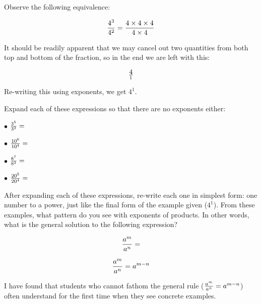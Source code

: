 

Observe the following equivalence:

$${4^3 \over 4^2} = {{4 \times 4 \times 4} \over {4 \times 4}}$$

It should be readily apparent that we may cancel out two quantities from both top and bottom of the fraction, so in the end we are left with this:

$$4 \over 1$$

Re-writing this using exponents, we get $4^1$.

\vskip 10pt

Expand each of these expressions so that there are no exponents either:

\vskip 10pt
\goodbreak
\item{$\bullet$} ${3^5 \over 3^2} = $
\vskip 10pt
\item{$\bullet$} ${10^6 \over 10^4} = $
\vskip 10pt
\item{$\bullet$} ${8^7 \over 8^3} = $
\vskip 10pt
\item{$\bullet$} ${20^5 \over 20^4} = $
\vskip 10pt

After expanding each of these expressions, re-write each one in simplest form: one number to a power, just like the final form of the example given ($4^1$).  From these examples, what pattern do you see with exponents of products.  In other words, what is the general solution to the following expression?

$${a^m \over a^n} = $$







$${a^m \over a^n} = a^{m-n}$$







I have found that students who cannot fathom the general rule (${a^m \over a^n} = a^{m-n}$) often understand for the first time when they see concrete examples.




